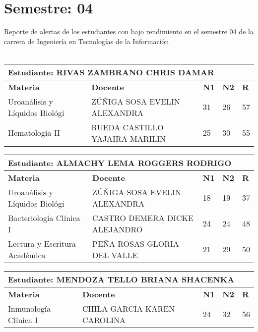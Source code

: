 \section{Semestre: 04}
        Reporte de alertas de los estudiantes con bajo rendimiento en el semestre 04 de la carrera de 
        Ingeniería en Tecnologías de la Información\\\\\small
\begin{tabularx}{\textwidth}{|p{5cm}|p{7cm}|X|X|X|}
\hline
\multicolumn{5}{|p{\dimexpr\textwidth-2\tabcolsep-2\arrayrulewidth}|}{\textbf{Estudiante: RIVAS ZAMBRANO CHRIS DAMAR }}\\\hline
\textbf{Materia} & \textbf{Docente} & \textbf{N1} & \textbf{N2} & \textbf{R} \\ \hline
Uroanálisis y Líquidos Biológi & ZÚÑIGA SOSA EVELIN ALEXANDRA  & 31 & 26& 57 \\ \hline
Hematología II & RUEDA CASTILLO YAJAIRA MARILIN  & 25 & 30& 55 \\ \hline
\end{tabularx}\vspace{10mm}
\small
\begin{tabularx}{\textwidth}{|p{5cm}|p{7cm}|X|X|X|}
\hline
\multicolumn{5}{|p{\dimexpr\textwidth-2\tabcolsep-2\arrayrulewidth}|}{\textbf{Estudiante: ALMACHY LEMA ROGGERS RODRIGO }}\\\hline
\textbf{Materia} & \textbf{Docente} & \textbf{N1} & \textbf{N2} & \textbf{R} \\ \hline
Uroanálisis y Líquidos Biológi & ZÚÑIGA SOSA EVELIN ALEXANDRA  & 18 & 19& 37 \\ \hline
Bacteriología Clínica I & CASTRO DEMERA DICKE ALEJANDRO  & 24 & 24& 48 \\ \hline
Lectura y Escritura Académica & PEÑA ROSAS GLORIA DEL VALLE  & 21 & 29& 50 \\ \hline
\end{tabularx}\vspace{10mm}
\small
\begin{tabularx}{\textwidth}{|p{5cm}|p{7cm}|X|X|X|}
\hline
\multicolumn{5}{|p{\dimexpr\textwidth-2\tabcolsep-2\arrayrulewidth}|}{\textbf{Estudiante: MENDOZA TELLO BRIANA SHACENKA }}\\\hline
\textbf{Materia} & \textbf{Docente} & \textbf{N1} & \textbf{N2} & \textbf{R} \\ \hline
Inmunología Clínica I & CHILA GARCIA KAREN CAROLINA  & 24 & 32& 56 \\ \hline
\end{tabularx}\vspace{10mm}
